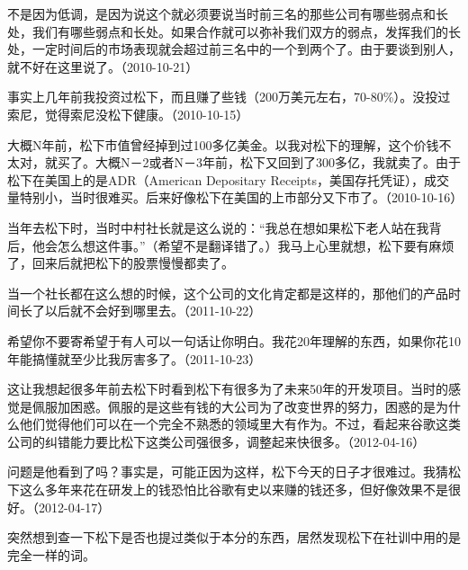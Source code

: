 不是因为低调，是因为说这个就必须要说当时前三名的那些公司有哪些弱点和长处，我们有哪些弱点和长处。如果合作就可以弥补我们双方的弱点，发挥我们的长处，一定时间后的市场表现就会超过前三名中的一个到两个了。由于要谈到别人，就不好在这里说了。（2010-10-21）


事实上几年前我投资过松下，而且赚了些钱（200万美元左右，70-80\%）。没投过索尼，觉得索尼没松下健康。（2010-10-15）

大概N年前，松下市值曾经掉到过100多亿美金。以我对松下的理解，这个价钱不太对，就买了。大概N－2或者N－3年前，松下又回到了300多亿，我就卖了。由于松下在美国上的是ADR（American Depositary Receipts，美国存托凭证），成交量特别小，当时很难买。后来好像松下在美国的上市部分又下市了。（2010-10-16）


当年去松下时，当时中村社长就是这么说的：“我总在想如果松下老人站在我背后，他会怎么想这件事。”（希望不是翻译错了。）我马上心里就想，松下要有麻烦了，回来后就把松下的股票慢慢都卖了。

当一个社长都在这么想的时候，这个公司的文化肯定都是这样的，那他们的产品时间长了以后就不会好到哪里去。（2011-10-22）


希望你不要寄希望于有人可以一句话让你明白。我花20年理解的东西，如果你花10年能搞懂就至少比我厉害多了。（2011-10-23）


这让我想起很多年前去松下时看到松下有很多为了未来50年的开发项目。当时的感觉是佩服加困惑。佩服的是这些有钱的大公司为了改变世界的努力，困惑的是为什么他们觉得他们可以在一个完全不熟悉的领域里大有作为。不过，看起来谷歌这类公司的纠错能力要比松下这类公司强很多，调整起来快很多。（2012-04-16）


问题是他看到了吗？事实是，可能正因为这样，松下今天的日子才很难过。我猜松下这么多年来花在研发上的钱恐怕比谷歌有史以来赚的钱还多，但好像效果不是很好。（2012-04-17）

突然想到查一下松下是否也提过类似于本分的东西，居然发现松下在社训中用的是完全一样的词。


